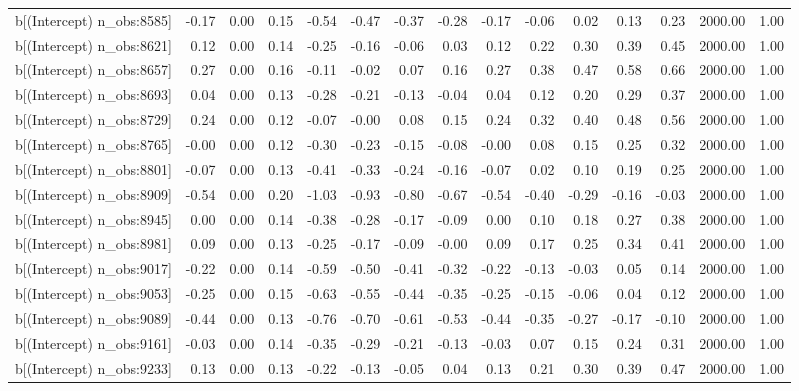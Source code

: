 \begin{table}[ht]
\begin{tabular}{rrrrrrrrrrrrrrr}
  b[(Intercept) n\_obs:8585] & -0.17 & 0.00 & 0.15 & -0.54 & -0.47 & -0.37 & -0.28 & -0.17 & -0.06 & 0.02 & 0.13 & 0.23 & 2000.00 & 1.00 \\ 
  b[(Intercept) n\_obs:8621] & 0.12 & 0.00 & 0.14 & -0.25 & -0.16 & -0.06 & 0.03 & 0.12 & 0.22 & 0.30 & 0.39 & 0.45 & 2000.00 & 1.00 \\ 
  b[(Intercept) n\_obs:8657] & 0.27 & 0.00 & 0.16 & -0.11 & -0.02 & 0.07 & 0.16 & 0.27 & 0.38 & 0.47 & 0.58 & 0.66 & 2000.00 & 1.00 \\ 
  b[(Intercept) n\_obs:8693] & 0.04 & 0.00 & 0.13 & -0.28 & -0.21 & -0.13 & -0.04 & 0.04 & 0.12 & 0.20 & 0.29 & 0.37 & 2000.00 & 1.00 \\ 
  b[(Intercept) n\_obs:8729] & 0.24 & 0.00 & 0.12 & -0.07 & -0.00 & 0.08 & 0.15 & 0.24 & 0.32 & 0.40 & 0.48 & 0.56 & 2000.00 & 1.00 \\ 
  b[(Intercept) n\_obs:8765] & -0.00 & 0.00 & 0.12 & -0.30 & -0.23 & -0.15 & -0.08 & -0.00 & 0.08 & 0.15 & 0.25 & 0.32 & 2000.00 & 1.00 \\ 
  b[(Intercept) n\_obs:8801] & -0.07 & 0.00 & 0.13 & -0.41 & -0.33 & -0.24 & -0.16 & -0.07 & 0.02 & 0.10 & 0.19 & 0.25 & 2000.00 & 1.00 \\ 
  b[(Intercept) n\_obs:8909] & -0.54 & 0.00 & 0.20 & -1.03 & -0.93 & -0.80 & -0.67 & -0.54 & -0.40 & -0.29 & -0.16 & -0.03 & 2000.00 & 1.00 \\ 
  b[(Intercept) n\_obs:8945] & 0.00 & 0.00 & 0.14 & -0.38 & -0.28 & -0.17 & -0.09 & 0.00 & 0.10 & 0.18 & 0.27 & 0.38 & 2000.00 & 1.00 \\ 
  b[(Intercept) n\_obs:8981] & 0.09 & 0.00 & 0.13 & -0.25 & -0.17 & -0.09 & -0.00 & 0.09 & 0.17 & 0.25 & 0.34 & 0.41 & 2000.00 & 1.00 \\ 
  b[(Intercept) n\_obs:9017] & -0.22 & 0.00 & 0.14 & -0.59 & -0.50 & -0.41 & -0.32 & -0.22 & -0.13 & -0.03 & 0.05 & 0.14 & 2000.00 & 1.00 \\ 
  b[(Intercept) n\_obs:9053] & -0.25 & 0.00 & 0.15 & -0.63 & -0.55 & -0.44 & -0.35 & -0.25 & -0.15 & -0.06 & 0.04 & 0.12 & 2000.00 & 1.00 \\ 
  b[(Intercept) n\_obs:9089] & -0.44 & 0.00 & 0.13 & -0.76 & -0.70 & -0.61 & -0.53 & -0.44 & -0.35 & -0.27 & -0.17 & -0.10 & 2000.00 & 1.00 \\ 
  b[(Intercept) n\_obs:9161] & -0.03 & 0.00 & 0.14 & -0.35 & -0.29 & -0.21 & -0.13 & -0.03 & 0.07 & 0.15 & 0.24 & 0.31 & 2000.00 & 1.00 \\ 
  b[(Intercept) n\_obs:9233] & 0.13 & 0.00 & 0.13 & -0.22 & -0.13 & -0.05 & 0.04 & 0.13 & 0.21 & 0.30 & 0.39 & 0.47 & 2000.00 & 1.00 \\ 

\end{tabular}
\end{table}
